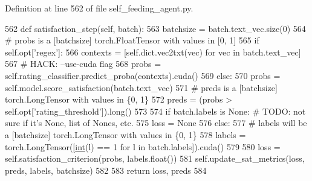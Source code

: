 Definition at line 562 of file self\+\_\+feeding\+\_\+agent.\+py.


\begin{DoxyCode}
562     \textcolor{keyword}{def }satisfaction\_step(self, batch):
563         batchsize = batch.text\_vec.size(0)
564         \textcolor{comment}{# probs is a [batchsize] torch.FloatTensor with values in [0, 1]}
565         \textcolor{keywordflow}{if} self.opt[\textcolor{stringliteral}{'regex'}]:
566             contexts = [self.dict.vec2txt(vec) \textcolor{keywordflow}{for} vec \textcolor{keywordflow}{in} batch.text\_vec]
567             \textcolor{comment}{# HACK: --use-cuda flag}
568             probs = self.rating\_classifier.predict\_proba(contexts).cuda()
569         \textcolor{keywordflow}{else}:
570             probs = self.model.score\_satisfaction(batch.text\_vec)
571         \textcolor{comment}{# preds is a [batchsize] torch.LongTensor with values in \{0, 1\}}
572         preds = (probs > self.opt[\textcolor{stringliteral}{'rating\_threshold'}]).long()
573 
574         \textcolor{keywordflow}{if} batch.labels \textcolor{keywordflow}{is} \textcolor{keywordtype}{None}:  \textcolor{comment}{# TODO: not sure if it's None, list of Nones, etc.}
575             loss = \textcolor{keywordtype}{None}
576         \textcolor{keywordflow}{else}:
577             \textcolor{comment}{# labels will be a [batchsize] torch.LongTensor with values in \{0, 1\}}
578             labels = torch.LongTensor([\hyperlink{namespacelanguage__model_1_1eval__ppl_a7d12ee00479673c5c8d1f6d01faa272a}{int}(l) == 1 \textcolor{keywordflow}{for} l \textcolor{keywordflow}{in} batch.labels]).cuda()
579 
580             loss = self.satisfaction\_criterion(probs, labels.float())
581             self.update\_sat\_metrics(loss, preds, labels, batchsize)
582 
583         \textcolor{keywordflow}{return} loss, preds
584 
\end{DoxyCode}
\mbox{\label{classprojects_1_1self__feeding_1_1self__feeding__agent_1_1SelfFeedingAgent_ad0e1cbdcc32b0c50e15de866efd963f3}} 
